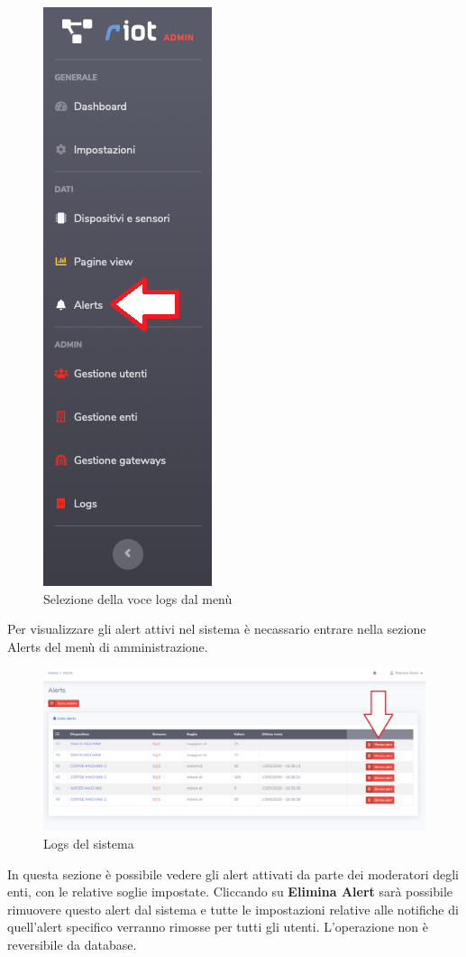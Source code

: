 	\begin{figure}[H]
		\centering
		\includegraphics[scale=0.600]{res/images/admin/menuAlerts.png}
		\caption{Selezione della voce logs dal menù}
	\end{figure}

		Per visualizzare gli alert attivi nel sistema è necassario entrare nella sezione Alerts del menù di amministrazione.

	\begin{figure}[H]
		\centering
		\includegraphics[scale=0.350]{res/images/admin/elimAlert.png}
		\caption{Logs del sistema}
	\end{figure}

	In questa sezione è possibile vedere gli alert attivati da parte dei moderatori degli enti, con le relative soglie impostate. Cliccando su \textbf{Elimina Alert} sarà possibile rimuovere questo alert dal sistema e tutte le impostazioni relative alle notifiche di quell'alert specifico verranno rimosse per tutti gli utenti. L'operazione non è reversibile da database. 